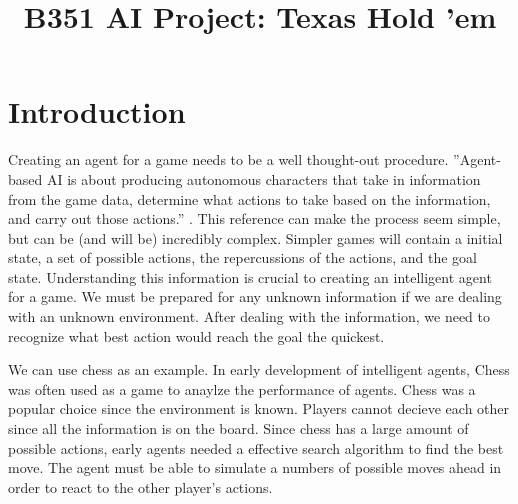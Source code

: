 \documentclass[10pt, a4paper, twocolumn]{article} %
\title{B351 AI Project: Texas Hold 'em} %
\author{
	\authorstyle{Steven Myers and Samuel Eleftheri} %
	\newline\newline %
	\institution{Indiana University, Bloomington, IN, USA} %
}
\begin{document}
\maketitle %

\thispagestyle{firstpage} %




\section{Introduction}

Creating an agent for a game needs to be a well thought-out procedure. ''Agent-based AI is about producing autonomous characters that take in information from the game data, determine what actions to take based on the information, and carry out those actions.'' \citep{Reference1}. This reference can make the process seem simple, but can be (and will be) incredibly complex. Simpler games will contain a initial state, a set of possible actions, the repercussions of the actions, and the goal state. Understanding this information is crucial to creating an intelligent agent for a game. We must be prepared for any unknown information if we are dealing with an unknown environment. After dealing with the information, we need to recognize what best action would reach the goal the quickest.

We can use chess as an example. In early development of intelligent agents, Chess was often used as a game to anaylze the performance of agents. Chess was a popular choice since the environment is known. Players cannot decieve each other since all the information is on the board. Since chess has a large amount of possible actions, early agents needed a effective search algorithm to find the best move. The agent must be able to simulate a numbers of possible moves ahead in order to react to the other player's actions.
\end{document}
